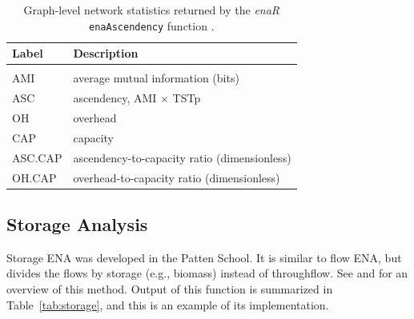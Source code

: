 \documentclass[article]{jss}
\begin{document}
\begin{table}[t]
  \caption{Graph-level network statistics returned by the \textit{enaR}
    \texttt{enaAscendency} function \citep[see][for
    interpretations]{ulanowicz86, ulanowicz97}.}\label{tab:asc}
  \center
  \begin{small}
    \begin{tabular}{l l}
      \textbf{Label} & \textbf{Description} \\ \hline \\[-1.5ex]
      AMI & average mutual information (bits) \\
      ASC & ascendency, AMI $\times$ TSTp \\
      OH & overhead \\
      CAP& capacity \\
      ASC.CAP& ascendency-to-capacity ratio (dimensionless)\\
      OH.CAP& overhead-to-capacity ratio (dimensionless)\\
      \hline
    \end{tabular}
  \end{small}
\end{table}

\subsection{Storage Analysis}
Storage ENA was developed in the Patten School.  It is similar to flow
ENA, but divides the flows by storage (e.g., biomass) instead of
throughflow.  See \citet{fath99_review} and \citet{schramski11} for an
overview of this method.  Output of this function is summarized in
Table~\ref{tab:storage}, and this is an example of its implementation.

\begin{Schunk}
\end{Schunk}
\end{document}
